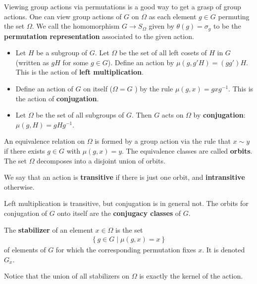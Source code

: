 \documentclass{memoir}
\begin{document}
Viewing group actions via permutations is a good way to get a grasp of group actions. One can view group actions of \(G\) on \(\Omega \) as each element \(g \in G\) permuting the set \(\Omega \). We call the homomorphism \(G\to S_{\Omega }\) given by \(\theta (g) = \sigma_g\) to be the \textbf{permutation representation} associated to the given action.

\begin{exmp}
	\begin{itemize}
		\item Let \(H\) be a subgroup of \(G\). Let \(\Omega\) be the set of all left cosets of \(H\) in \(G\) (written as \(gH\) for some \(g \in G\)). Define an action by \(\mu(g,g'H) = (gg')H\). This is the action of \textbf{left multiplication}.
		\item Define an action of \(G\) on itself (\(\Omega = G\) ) by the rule \(\mu(g,x) = gxg^{-1}\). This is the action of \textbf{conjugation}.
		\item Let \(\Omega\) be the set of all subgroups of \(G\). Then \(G\) acts on \(\Omega\) by \textbf{conjugation}: \(\mu(g,H) = gHg^{-1}\).
	\end{itemize}
\end{exmp}
An equivalence relation on \(\Omega\) is formed by a group action via the rule that \(x \sim y\) if there exists \(g \in G\) with \(\mu(g,x) = y\). The equivalence classes are called \textbf{orbits}. The set \(\Omega\) decomposes into a disjoint union of orbits.
\begin{defn}[Transitivity]
	We say that an action is \textbf{transitive} if there is just one orbit, and \textbf{intransitive} otherwise.
\end{defn}
Left multiplication is transitive, but conjugation is in general not. The orbits for conjugation of \(G\) onto itself are the \textbf{conjugacy classes} of \(G\).
\begin{defn}[Stabilizer]
	The \textbf{stabilizer} of an element \(x \in \Omega\) is the set
	\begin{align*}
		\left\{g \in G \mid \mu(g,x) = x \right\} 
	\end{align*}
	of elements of \(G\) for which the corresponding permutation fixes \(x\). It is denoted \(G_x\).
\end{defn}
Notice that the union of all stabilizers on \(\Omega \) is exactly the kernel of the action.
\end{document}
